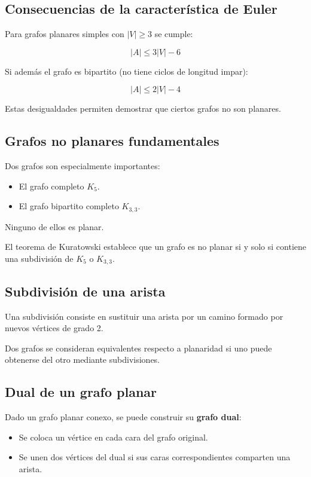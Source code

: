 \documentclass[12pt]{article}
\theoremstyle{plain}
\theoremstyle{definition}
\theoremstyle{remark}
\begin{document}
\subsection*{Consecuencias de la característica de Euler}

Para grafos planares simples con $|V| \ge 3$ se cumple:

\[
|A| \le 3|V| - 6
\]

Si además el grafo es bipartito (no tiene ciclos de longitud impar):

\[
|A| \le 2|V| - 4
\]

Estas desigualdades permiten demostrar que ciertos grafos no son planares.

\subsection*{Grafos no planares fundamentales}

Dos grafos son especialmente importantes:

\begin{itemize}
    \item El grafo completo $K_5$.
    \item El grafo bipartito completo $K_{3,3}$.
\end{itemize}

Ninguno de ellos es planar.

El teorema de Kuratowski establece que un grafo es no planar si y solo si contiene una subdivisión de $K_5$ o $K_{3,3}$.

\subsection*{Subdivisión de una arista}

Una subdivisión consiste en sustituir una arista por un camino formado por nuevos vértices de grado 2.

Dos grafos se consideran equivalentes respecto a planaridad si uno puede obtenerse del otro mediante subdivisiones.

\subsection*{Dual de un grafo planar}

Dado un grafo planar conexo, se puede construir su \textbf{grafo dual}:

\begin{itemize}
    \item Se coloca un vértice en cada cara del grafo original.
    \item Se unen dos vértices del dual si sus caras correspondientes comparten una arista.
\end{itemize}
\end{document}
